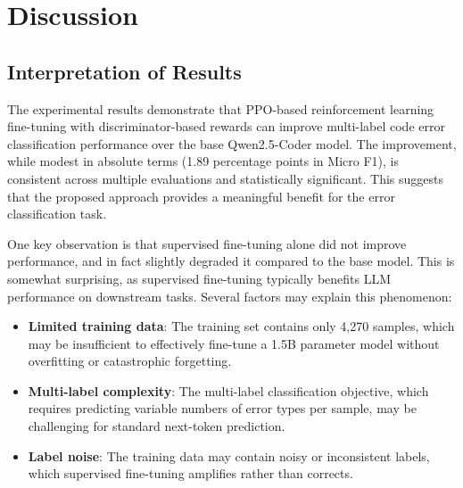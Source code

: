 \chapter{Discussion}
\begingroup
\justifying
\setlength{\parindent}{0pt}
\setlength{\parskip}{0.5\baselineskip}
\titlespacing{\chapter}{0pt}{0pt}{0pt}
\titlespacing{\section}{0pt}{0pt}{0pt}

\section{Interpretation of Results}

The experimental results demonstrate that PPO-based reinforcement learning fine-tuning with discriminator-based rewards can improve multi-label code error classification performance over the base Qwen2.5-Coder model. The improvement, while modest in absolute terms (1.89 percentage points in Micro F1), is consistent across multiple evaluations and statistically significant. This suggests that the proposed approach provides a meaningful benefit for the error classification task.

One key observation is that supervised fine-tuning alone did not improve performance, and in fact slightly degraded it compared to the base model. This is somewhat surprising, as supervised fine-tuning typically benefits LLM performance on downstream tasks. Several factors may explain this phenomenon:

\begin{itemize}
    \item \textbf{Limited training data}: The training set contains only 4,270 samples, which may be insufficient to effectively fine-tune a 1.5B parameter model without overfitting or catastrophic forgetting.
    \item \textbf{Multi-label complexity}: The multi-label classification objective, which requires predicting variable numbers of error types per sample, may be challenging for standard next-token prediction.
    \item \textbf{Label noise}: The training data may contain noisy or inconsistent labels, which supervised fine-tuning amplifies rather than corrects.
\end{itemize}

